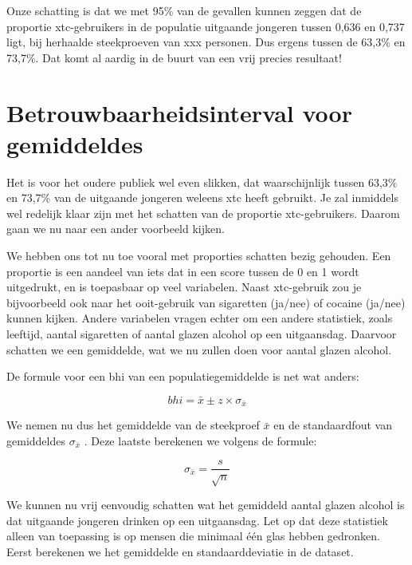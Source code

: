 \documentclass[
  letterpaper,
  DIV=11,
  numbers=noendperiod]{scrreprt}
\newenvironment{Shaded}{\begin{snugshade}}{\end{snugshade}}
\newcommand{\AttributeTok}[1]{\textcolor[rgb]{0.40,0.45,0.13}{#1}}
\newcommand{\CommentTok}[1]{\textcolor[rgb]{0.37,0.37,0.37}{#1}}
\newcommand{\ConstantTok}[1]{\textcolor[rgb]{0.56,0.35,0.01}{#1}}
\newcommand{\FunctionTok}[1]{\textcolor[rgb]{0.28,0.35,0.67}{#1}}
\newcommand{\NormalTok}[1]{\textcolor[rgb]{0.00,0.23,0.31}{#1}}
\newcommand{\SpecialCharTok}[1]{\textcolor[rgb]{0.37,0.37,0.37}{#1}}
\begin{document}
Onze schatting is dat we met 95\% van de gevallen kunnen zeggen dat de
proportie xtc-gebruikers in de populatie uitgaande jongeren tussen 0,636
en 0,737 ligt, bij herhaalde steekproeven van xxx personen. Dus ergens
tussen de 63,3\% en 73,7\%. Dat komt al aardig in de buurt van een vrij
precies resultaat!

\section{Betrouwbaarheidsinterval voor
gemiddeldes}\label{betrouwbaarheidsinterval-voor-gemiddeldes}

Het is voor het oudere publiek wel even slikken, dat waarschijnlijk
tussen 63,3\% en 73,7\% van de uitgaande jongeren weleens xtc heeft
gebruikt. Je zal inmiddels wel redelijk klaar zijn met het schatten van
de proportie xtc-gebruikers. Daarom gaan we nu naar een ander voorbeeld
kijken.

We hebben ons tot nu toe vooral met proporties schatten bezig gehouden.
Een proportie is een aandeel van iets dat in een score tussen de 0 en 1
wordt uitgedrukt, en is toepasbaar op veel variabelen. Naast xtc-gebruik
zou je bijvoorbeeld ook naar het ooit-gebruik van sigaretten (ja/nee) of
cocaine (ja/nee) kunnen kijken. Andere variabelen vragen echter om een
andere statistiek, zoals leeftijd, aantal sigaretten of aantal glazen
alcohol op een uitgaansdag. Daarvoor schatten we een gemiddelde, wat we
nu zullen doen voor aantal glazen alcohol.

De formule voor een bhi van een populatiegemiddelde is net wat anders:

\[ bhi = \bar{x} \pm z\times\sigma_{\bar{x}}  \]

We nemen nu dus het gemiddelde van de steekproef \(\bar{x}\) en de
standaardfout van gemiddeldes \(\sigma_{\bar{x}}\) . Deze laatste
berekenen we volgens de formule:

\[ \sigma_{\bar{x}}=\frac{s}{\sqrt{n}} \]

We kunnen nu vrij eenvoudig schatten wat het gemiddeld aantal glazen
alcohol is dat uitgaande jongeren drinken op een uitgaansdag. Let op dat
deze statistiek alleen van toepassing is op mensen die minimaal één glas
hebben gedronken. Eerst berekenen we het gemiddelde en standaarddeviatie
in de dataset.

\begin{Shaded}
\end{Shaded}
\end{document}
